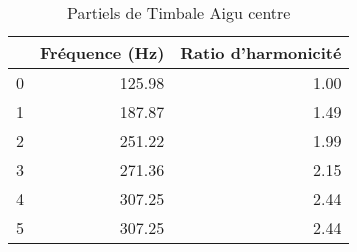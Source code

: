 \begin{table}
\centering
\caption{Partiels de Timbale Aigu centre}
\label{table:partiels-timbale-aigu-4.wav}
\begin{tabular}{lrr}
\toprule
{} &  Fréquence (Hz) &  Ratio d'harmonicité \\
\midrule
0 &          125.98 &                 1.00 \\
1 &          187.87 &                 1.49 \\
2 &          251.22 &                 1.99 \\
3 &          271.36 &                 2.15 \\
4 &          307.25 &                 2.44 \\
5 &          307.25 &                 2.44 \\
\bottomrule
\end{tabular}
\end{table}
